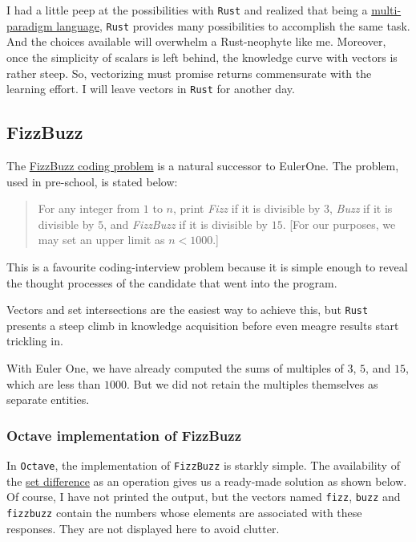 \documentclass[
  a4paper,
]{article}
\begin{document}
I had a little peep at the possibilities with \texttt{Rust} and realized
that being a
\href{https://en.wikipedia.org/wiki/Comparison_of_multi-paradigm_programming_languages}{multi-paradigm
language}, \texttt{Rust} provides many possibilities to accomplish the
same task. And the choices available will overwhelm a Rust-neophyte like
me. Moreover, once the simplicity of scalars is left behind, the
knowledge curve with vectors is rather steep. So, vectorizing must
promise returns commensurate with the learning effort. I will leave
vectors in \texttt{Rust} for another day.

\hypertarget{fizzbuzz}{%
\subsection{FizzBuzz}\label{fizzbuzz}}

The \href{https://leetcode.com/problems/fizz-buzz/}{FizzBuzz coding
problem} is a natural successor to EulerOne. The problem, used in
pre-school, is stated below:

\begin{quote}
For any integer from \(1\) to \(n\), print \emph{Fizz} if it is
divisible by \(3\), \emph{Buzz} if it is divisible by \(5\), and
\emph{FizzBuzz} if it is divisible by \(15\). {[}For our purposes, we
may set an upper limit as \(n < 1000\).{]}
\end{quote}

This is a favourite coding-interview problem because it is simple enough
to reveal the thought processes of the candidate that went into the
program.

Vectors and set intersections are the easiest way to achieve this, but
\texttt{Rust} presents a steep climb in knowledge acquisition before
even meagre results start trickling in.

With Euler One, we have already computed the sums of multiples of \(3\),
\(5\), and \(15\), which are less than \(1000\). But we did not retain
the multiples themselves as separate entities.

\hypertarget{octave-implementation-of-fizzbuzz}{%
\subsubsection{Octave implementation of
FizzBuzz}\label{octave-implementation-of-fizzbuzz}}

In \texttt{Octave}, the implementation of \texttt{FizzBuzz} is starkly
simple. The availability of the
\href{https://en.wikipedia.org/wiki/Complement_(set_theory)\#Relative_complement}{set
difference} as an operation gives us a ready-made solution as shown
below. Of course, I have not printed the output, but the vectors named
\texttt{fizz}, \texttt{buzz} and \texttt{fizzbuzz} contain the numbers
whose elements are associated with these responses. They are not
displayed here to avoid clutter.
\end{document}
